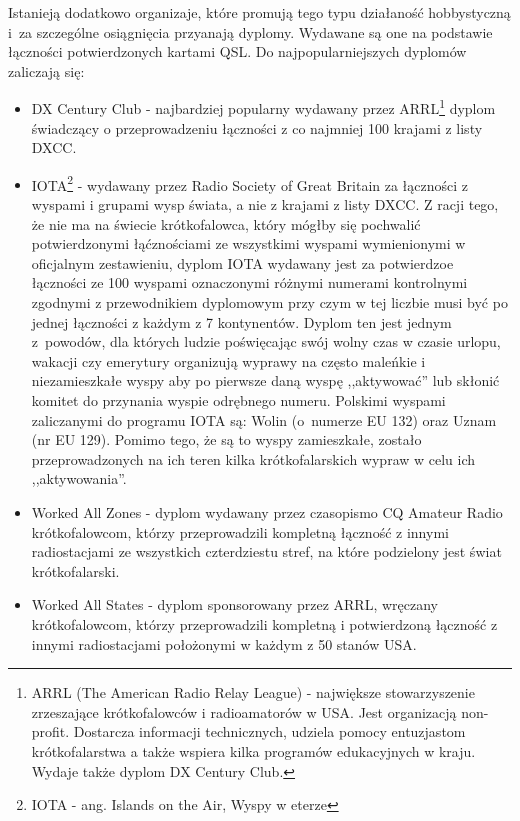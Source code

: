 \documentclass[]{mgr}
\begin{document}
                Istanieją dodatkowo organizaje, które promują tego typu działaność hobbystyczną i~za szczególne osiągnięcia przyanają dyplomy. Wydawane są one na podstawie łączności potwierdzonych kartami QSL. Do najpopularniejszych dyplomów zaliczają się:
                \begin{itemize}
                    \item DX Century Club - najbardziej popularny wydawany przez ARRL\footnote{ARRL (The American Radio Relay League) - największe stowarzyszenie zrzeszające krótkofalowców i radioamatorów w USA. Jest organizacją non-profit. Dostarcza informacji technicznych, udziela pomocy entuzjastom krótkofalarstwa a także wspiera kilka programów edukacyjnych w kraju. Wydaje także dyplom DX Century Club.} dyplom świadczący o przeprowadzeniu łączności z co najmniej 100 krajami z listy DXCC.
                    \item IOTA\footnote{IOTA - ang. Islands on the Air, Wyspy w eterze} - wydawany przez Radio Society of Great Britain za łączności z wyspami i grupami wysp świata, a nie z krajami z listy DXCC. Z racji tego, że nie ma na świecie krótkofalowca, który mógłby się pochwalić potwierdzonymi łąćznościami ze wszystkimi wyspami wymienionymi w oficjalnym zestawieniu, dyplom IOTA wydawany jest za potwierdzoe łączności ze 100 wyspami oznaczonymi różnymi numerami kontrolnymi zgodnymi z przewodnikiem dyplomowym przy czym w tej liczbie musi być po jednej łączności z każdym z 7 kontynentów. Dyplom ten jest jednym z~powodów, dla których ludzie poświęcając swój wolny czas w czasie urlopu, wakacji czy emerytury organizują wyprawy na często maleńkie i niezamieszkałe wyspy aby po pierwsze daną wyspę ,,aktywować'' lub skłonić komitet do przynania wyspie odrębnego numeru. Polskimi wyspami zaliczanymi do programu IOTA są: Wolin (o~numerze EU 132) oraz Uznam (nr EU 129). Pomimo tego, że są to wyspy zamieszkałe, zostało przeprowadzonych na ich teren kilka krótkofalarskich wypraw w celu ich ,,aktywowania''.
                    \item Worked All Zones - dyplom wydawany przez czasopismo CQ Amateur Radio krótkofalowcom, którzy przeprowadzili kompletną łączność z innymi radiostacjami ze wszystkich czterdziestu stref, na które podzielony jest świat krótkofalarski.
                    \item Worked All States - dyplom sponsorowany przez ARRL, wręczany krótkofalowcom, którzy przeprowadzili kompletną i potwierdzoną łączność z innymi radiostacjami położonymi w każdym z 50 stanów USA.
                \end{itemize}
\end{document}
